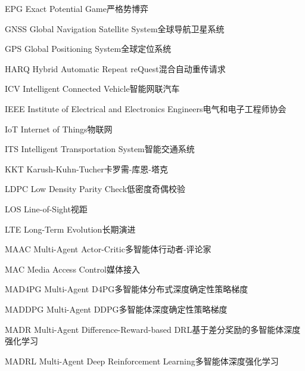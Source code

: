 \begin{abbreviate}[0mm][18mm]
\item[EPG] Exact Potential Game\hspace{1em}严格势博弈
\item[GNSS] Global Navigation Satellite System\hspace{1em}全球导航卫星系统
\item[GPS] Global Positioning System\hspace{1em}全球定位系统
\item[HARQ] Hybrid Automatic Repeat reQuest\hspace{1em}混合自动重传请求
\item[ICV] Intelligent Connected Vehicle\hspace{1em}智能网联汽车
\item[IEEE] Institute of Electrical and Electronics Engineers\hspace{1em}电气和电子工程师协会
\item[IoT] Internet of Things\hspace{1em}物联网
\item[ITS] Intelligent Transportation System\hspace{1em}智能交通系统
\item[KKT] Karush-Kuhn-Tucher\hspace{1em}卡罗需-库恩-塔克
\item[LDPC] Low Density Parity Check\hspace{1em}低密度奇偶校验
\item[LOS] Line-of-Sight\hspace{1em}视距
\item[LTE] Long-Term Evolution\hspace{1em}长期演进
\item[MAAC] Multi-Agent Actor-Critic\hspace{1em}多智能体行动者-评论家
\item[MAC] Media Access Control\hspace{1em}媒体接入
\item[MAD4PG] Multi-Agent D4PG\hspace{1em}多智能体分布式深度确定性策略梯度
\item[MADDPG] Multi-Agent DDPG\hspace{1em}多智能体深度确定性策略梯度
\item[MADR] Multi-Agent Difference-Reward-based DRL\hspace{1em}基于差分奖励的多智能体深度强化学习
\item[MADRL] Multi-Agent Deep Reinforcement Learning\hspace{1em}多智能体深度强化学习

\end{abbreviate}
